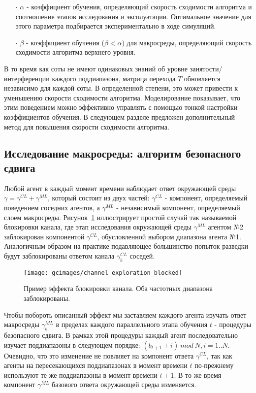 \begin{itemize}
\item[$\cdot$]$ \alpha$ - коэффициент обучения, определяющий скорость сходимости алгоритма и соотношение этапов исследования и эксплуатации. Оптимальное значение для этого параметра подбирается экспериментально в ходе симуляций.
\item[$\cdot$] $\beta$ - коэффициент обучения ($\beta < \alpha$) для макросреды, определяющий скорость сходимости алгоритма верхнего уровня.
\end{itemize} 

В то время как соты не имеют одинаковых знаний об уровне занятости/интерференции каждого поддиапазона, матрица перехода $T$ обновляется независимо для каждой соты. В определенной степени, это может привести к уменьшению скорости сходимости алгоритма. Моделирование показывает, что этим поведением можно эффективно управлять с помощью тонкой настройки коэффициентов обучения. В следующем разделе предложен дополнительный метод для повышения скорости сходимости алгоритма.

\subsection{Исследование макросреды: алгоритм безопасного сдвига}
\label{sec:safe_shift}
Любой агент в каждый момент времени наблюдает ответ окружающей среды $\gamma = \gamma^{CL} + \gamma^{ML}$, который состоит из двух частей: $\gamma^{CL}$ - компонент, определяемый поведением соседних агентов, а $\gamma^{ML}$ - независимый компонент, определяемый слоем макросреды.
Рисунок~\ref{fig:channel_exploration_blocked} иллюстрирует простой случай так называемой блокировки канала, где этап исследования окружающей среды $\gamma^{ML}$ агентом №2 заблокирован компонентой $\gamma^{CL}$, обусловленной выбором диапазона агента №1. Аналогичным образом на практике подавляющее большинство попыток разведки будут заблокированы ответом канала $\gamma_b^{CL}$ соседей. 

\begin{figure}[h!]
    \centering
    \texttt{[image: gcimages/channel\_exploration\_blocked]}
    \caption{Пример эффекта блокировки канала. Оба частотных диапазона заблокированы.}
    \label{fig:channel_exploration_blocked}
\end{figure}

Чтобы побороть описанный эффект мы заставляем каждого агента изучать ответ макросреды $\gamma_b^{ML}$ в пределах каждого параллельного этапа обучения $t$ - процедуры безопасного сдвига. В рамках этой процедуры каждый агент последовательно изучает поддиапазоны в следующем порядке: ${(b_{t+1}+i)~mod~N}, i=1..N$. Очевидно, что это изменение не повлияет на компонент ответа $\gamma^{CL}$, так как агенты на пересекающихся поддиапазонах в момент времени $t$ по-прежнему используют те же поддиапазоны в момент времени ${t+1}$. В то же время компонент $\gamma^{ML}$ базового ответа окружающей среды изменяется.


